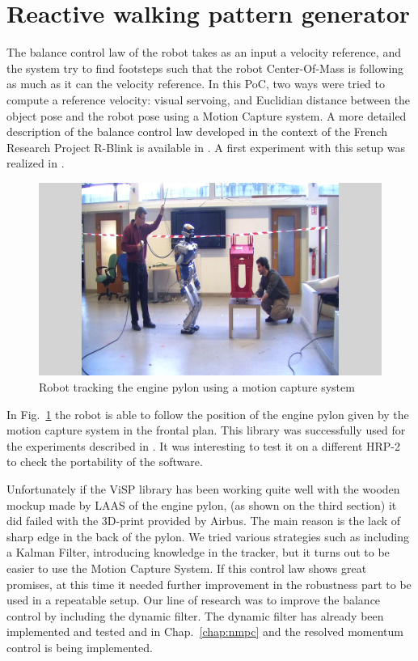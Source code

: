 \section{Reactive walking pattern generator}

The balance control law of the robot takes as an input a velocity reference, and the system 
try to find footsteps such that the robot Center-Of-Mass is following as much as it can the velocity reference. 
In this PoC, two ways were tried to compute a reference velocity: visual servoing, and Euclidian distance between 
the object pose and the robot pose using a Motion Capture system. A more detailed description of the balance control 
law developed in the context of the French Research Project R-Blink is available in \cite{herdt:ar:2010}. 
A first experiment with this setup was realized in \cite{dune:iros:11}.

\begin{figure}
  \begin{center}
    \includegraphics[clip=true, keepaspectratio, height=0.28\linewidth, trim={6.5cm 0cm 6.5cm 0cm}]{figures/engine_pylon.png}
  \end{center}
  \caption{Robot tracking the engine pylon using a motion capture system}
  \label{fig:engine:pylon}
\end{figure}

In Fig.~\ref{fig:engine:pylon} the robot is able to follow the position of the engine pylon given by the motion capture system in the frontal plan.
This library was successfully used for the experiments described in \cite{dune:iros:11}. 
It was interesting to test it on a different HRP-2 to check the portability of the software.

Unfortunately if the ViSP library has been working quite well with the wooden mockup made by LAAS of the engine pylon, 
(as shown on the third section) it did failed with the 3D-print provided by Airbus. 
The main reason is the lack of sharp edge in the back of the pylon. 
We tried various strategies such as including a Kalman Filter, introducing knowledge in the tracker, 
but it turns out to be easier to use the Motion Capture System.
If this control law shows great promises, at this time it needed further improvement in the robustness part to be used in a repeatable setup. 
Our line of research was to improve the balance control by including the dynamic filter.
The dynamic filter has already been implemented and tested \cite{naveau:ichr:2014} and in Chap.~\ref{chap:nmpc} and the resolved momentum control is being implemented.


